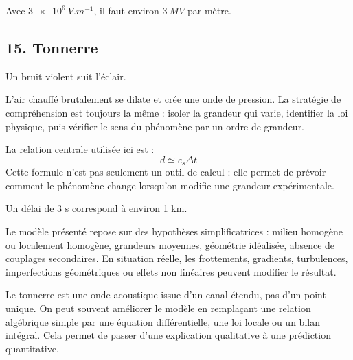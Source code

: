 \documentclass[11pt,a4paper]{article}
\begin{document}
\begin{corrigebox}[Indication]
Avec $\SI{3e6}{V.m^{-1}}$, il faut environ $\SI{3}{MV}$ par mètre.
\end{corrigebox}


\subsection{15. Tonnerre}

\begin{exemplebox}
Un bruit violent suit l'éclair.
\end{exemplebox}

\begin{methodebox}
L'air chauffé brutalement se dilate et crée une onde de pression.
La stratégie de compréhension est toujours la même : isoler la grandeur qui varie, identifier la loi physique, puis vérifier le sens du phénomène par un ordre de grandeur.
\end{methodebox}

\begin{theorembox}
La relation centrale utilisée ici est :
\[
d\simeq c_s\Delta t
\]
Cette formule n'est pas seulement un outil de calcul : elle permet de prévoir comment le phénomène change lorsqu'on modifie une grandeur expérimentale.
\end{theorembox}

\begin{odgbox}
Un délai de 3 s correspond à environ 1 km.
\end{odgbox}

\begin{attentionbox}
Le modèle présenté repose sur des hypothèses simplificatrices : milieu homogène ou localement homogène, grandeurs moyennes, géométrie idéalisée, absence de couplages secondaires. En situation réelle, les frottements, gradients, turbulences, imperfections géométriques ou effets non linéaires peuvent modifier le résultat.
\end{attentionbox}

\begin{approfondissementbox}
Le tonnerre est une onde acoustique issue d'un canal étendu, pas d'un point unique.
On peut souvent améliorer le modèle en remplaçant une relation algébrique simple par une équation différentielle, une loi locale ou un bilan intégral. Cela permet de passer d'une explication qualitative à une prédiction quantitative.
\end{approfondissementbox}
\end{document}
